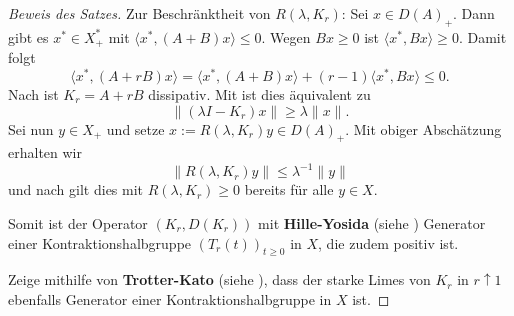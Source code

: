 \begin{proof}[Beweis des Satzes]
\par 
Zur Beschränktheit von $R(\lambda,K_r)$: Sei $x\in D(A)_+$. %
Dann gibt es $x^*\in X_+^*$ mit $\langle x^*, (A+B)x\rangle\leq 0$. Wegen $Bx\geq0$ ist $\langle x^*, Bx\rangle \geq0$. Damit folgt
\begin{equation*}
\langle x^*, (A+rB)x\rangle = \langle x^*, (A+B)x\rangle + (r-1)\langle x^*, Bx\rangle \leq  0.
\end{equation*}
Nach \Cref{} ist $K_r=A+rB$ dissipativ. Mit  ist dies äquivalent zu 
\begin{equation*}\label{equation1}
\|(\lambda I - K_r)x\|\geq \lambda \|x\|.
\end{equation*}
Sei nun $y\in X_+$ und setze $x:=R(\lambda, K_r)y\in D(A)_+$. Mit obiger Abschätzung erhalten wir
\begin{equation}\label{Resolvente von K_r ist relativ beschränkt}
\|R(\lambda, K_r)y\|\leq \lambda^{-1}\|y\|
\end{equation}
und nach  gilt dies mit $R(\lambda, K_r)\geq0$  bereits für alle $y\in X$.



\par
Somit ist  der Operator  $(K_r, D(K_r))$ mit \textbf{Hille-Yosida} (siehe ) Generator einer Kontraktionshalbgruppe $(T_r(t))_{t\geq0}$ in $X$, die zudem positiv ist.

\par
Zeige mithilfe von \textbf{Trotter-Kato} (siehe ), dass der starke Limes von $K_r$ in $r\uparrow 1$ ebenfalls Generator einer Kontraktionshalbgruppe in $X$ ist.


\end{proof}
